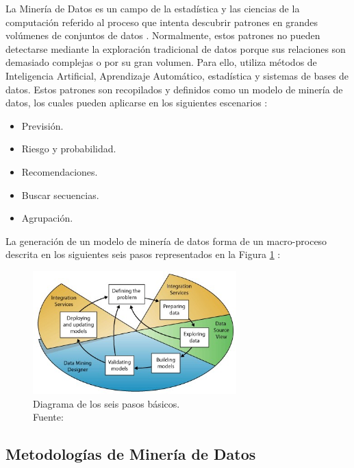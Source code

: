 La Minería de Datos es un campo de la estadística y las ciencias de la computación referido al proceso que intenta descubrir patrones en grandes volúmenes de conjuntos de datos \parencite{bk_maimon2010datamining}. Normalmente, estos patrones no pueden detectarse mediante la exploración tradicional de datos porque sus relaciones son demasiado complejas o por su gran volumen. Para ello, utiliza métodos de Inteligencia Artificial, Aprendizaje Automático, estadística y sistemas de bases de datos. Estos patrones son recopilados y definidos como un modelo de minería de datos, los cuales pueden aplicarse en los siguientes escenarios \parencite{gl_microsoft2019datamining}:
\begin{itemize}
	\item Previsión.
	\item Riesgo y probabilidad.
	\item Recomendaciones.
	\item Buscar secuencias.
	\item Agrupación.
\end{itemize}

La generación de un modelo de minería de datos forma de un macro-proceso descrita en los siguientes seis pasos representados en la Figura \ref{2:fig6} \parencite{gl_microsoft2019datamining}:
\begin{figure}[h]
	\begin{center}
		\includegraphics[width=0.7\textwidth]{2/figures/data_mining_steps.jpg}
		\caption[Diagrama de los seis pasos básicos]{Diagrama de los seis pasos básicos.\\
		Fuente: \cite{gl_microsoft2019datamining}}
		\label{2:fig6}
	\end{center}
\end{figure}

\clearpage

\subsection{Metodologías de Minería de Datos}

